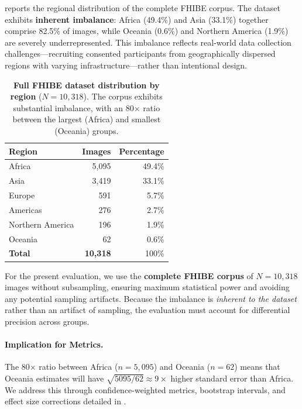 \documentclass{article}
\begin{document}
 reports the regional distribution of the complete FHIBE corpus. The dataset exhibits \textbf{inherent imbalance}: Africa (49.4\%) and Asia (33.1\%) together comprise 82.5\% of images, while Oceania (0.6\%) and Northern America (1.9\%) are severely underrepresented. This imbalance reflects real-world data collection challenges---recruiting consented participants from geographically dispersed regions with varying infrastructure---rather than intentional design.

\begin{table}[t]
\centering
\caption{\textbf{Full FHIBE dataset distribution by region} ($N = 10{,}318$). The corpus exhibits substantial imbalance, with an 80$\times$ ratio between the largest (Africa) and smallest (Oceania) groups.}
\label{tab:fhibe_full}
\begin{tabular}{lrr}
\toprule
\textbf{Region} & \textbf{Images} & \textbf{Percentage} \\
\midrule
Africa & 5{,}095 & 49.4\% \\
Asia & 3{,}419 & 33.1\% \\
Europe & 591 & 5.7\% \\
Americas & 276 & 2.7\% \\
Northern America & 196 & 1.9\% \\
Oceania & 62 & 0.6\% \\
\midrule
\textbf{Total} & \textbf{10{,}318} & 100\% \\
\bottomrule
\end{tabular}
\end{table}

For the present evaluation, we use the \textbf{complete FHIBE corpus} of $N = 10{,}318$ images without subsampling, ensuring maximum statistical power and avoiding any potential sampling artifacts. Because the imbalance is \emph{inherent to the dataset} rather than an artifact of sampling, the evaluation must account for differential precision across groups.

\paragraph{Implication for Metrics.} The 80$\times$ ratio between Africa ($n=5{,}095$) and Oceania ($n=62$) means that Oceania estimates will have $\sqrt{5095/62} \approx 9\times$ higher standard error than Africa. We address this through confidence-weighted metrics, bootstrap intervals, and effect size corrections detailed in .
\end{document}
